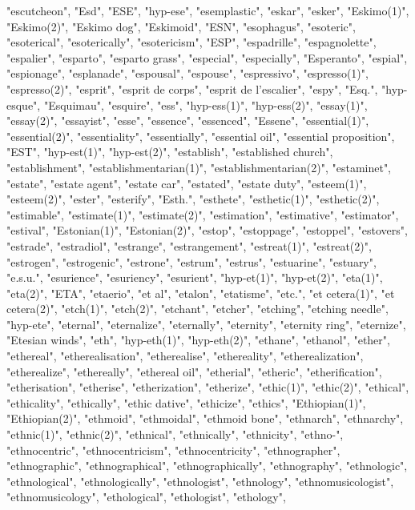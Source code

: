 "escutcheon",
"Esd",
"ESE",
"hyp-ese",
"esemplastic",
"eskar",
"esker",
"Eskimo(1)",
"Eskimo(2)",
"Eskimo dog",
"Eskimoid",
"ESN",
"esophagus",
"esoteric",
"esoterical",
"esoterically",
"esotericism",
"ESP",
"espadrille",
"espagnolette",
"espalier",
"esparto",
"esparto grass",
"especial",
"especially",
"Esperanto",
"espial",
"espionage",
"esplanade",
"espousal",
"espouse",
"espressivo",
"espresso(1)",
"espresso(2)",
"esprit",
"esprit de corps",
"esprit de l'escalier",
"espy",
"Esq.",
"hyp-esque",
"Esquimau",
"esquire",
"ess",
"hyp-ess(1)",
"hyp-ess(2)",
"essay(1)",
"essay(2)",
"essayist",
"esse",
"essence",
"essenced",
"Essene",
"essential(1)",
"essential(2)",
"essentiality",
"essentially",
"essential oil",
"essential proposition",
"EST",
"hyp-est(1)",
"hyp-est(2)",
"establish",
"established church",
"establishment",
"establishmentarian(1)",
"establishmentarian(2)",
"estaminet",
"estate",
"estate agent",
"estate car",
"estated",
"estate duty",
"esteem(1)",
"esteem(2)",
"ester",
"esterify",
"Esth.",
"esthete",
"esthetic(1)",
"esthetic(2)",
"estimable",
"estimate(1)",
"estimate(2)",
"estimation",
"estimative",
"estimator",
"estival",
"Estonian(1)",
"Estonian(2)",
"estop",
"estoppage",
"estoppel",
"estovers",
"estrade",
"estradiol",
"estrange",
"estrangement",
"estreat(1)",
"estreat(2)",
"estrogen",
"estrogenic",
"estrone",
"estrum",
"estrus",
"estuarine",
"estuary",
"e.s.u.",
"esurience",
"esuriency",
"esurient",
"hyp-et(1)",
"hyp-et(2)",
"eta(1)",
"eta(2)",
"ETA",
"etaerio",
"et al",
"etalon",
"etatisme",
"etc.",
"et cetera(1)",
"et cetera(2)",
"etch(1)",
"etch(2)",
"etchant",
"etcher",
"etching",
"etching needle",
"hyp-ete",
"eternal",
"eternalize",
"eternally",
"eternity",
"eternity ring",
"eternize",
"Etesian winds",
"eth",
"hyp-eth(1)",
"hyp-eth(2)",
"ethane",
"ethanol",
"ether",
"ethereal",
"etherealisation",
"etherealise",
"ethereality",
"etherealization",
"etherealize",
"ethereally",
"ethereal oil",
"etherial",
"etheric",
"etherification",
"etherisation",
"etherise",
"etherization",
"etherize",
"ethic(1)",
"ethic(2)",
"ethical",
"ethicality",
"ethically",
"ethic dative",
"ethicize",
"ethics",
"Ethiopian(1)",
"Ethiopian(2)",
"ethmoid",
"ethmoidal",
"ethmoid bone",
"ethnarch",
"ethnarchy",
"ethnic(1)",
"ethnic(2)",
"ethnical",
"ethnically",
"ethnicity",
"ethno-",
"ethnocentric",
"ethnocentricism",
"ethnocentricity",
"ethnographer",
"ethnographic",
"ethnographical",
"ethnographically",
"ethnography",
"ethnologic",
"ethnological",
"ethnologically",
"ethnologist",
"ethnology",
"ethnomusicologist",
"ethnomusicology",
"ethological",
"ethologist",
"ethology",
